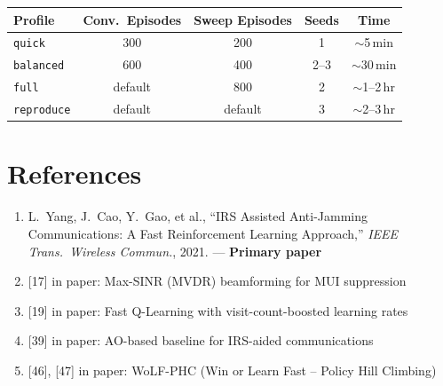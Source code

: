 \documentclass[11pt,a4paper]{article}
\begin{document}
\begin{table}[H]
\centering
\begin{tabular}{lcccc}
\toprule
\textbf{Profile} & \textbf{Conv.\ Episodes} & \textbf{Sweep Episodes} & \textbf{Seeds} & \textbf{Time} \\
\midrule
\texttt{quick} & 300 & 200 & 1 & $\sim$5\,min \\
\texttt{balanced} & 600 & 400 & 2--3 & $\sim$30\,min \\
\texttt{full} & default & 800 & 2 & $\sim$1--2\,hr \\
\texttt{reproduce} & default & default & 3 & $\sim$2--3\,hr \\
\bottomrule
\end{tabular}
\end{table}


\section{References}

\begin{enumerate}
    \item L.~Yang, J.~Cao, Y.~Gao, et al., ``IRS Assisted Anti-Jamming Communications: A Fast Reinforcement Learning Approach,'' \emph{IEEE Trans.\ Wireless Commun.}, 2021. --- \textbf{Primary paper}
    \item {[17] in paper}: Max-SINR (MVDR) beamforming for MUI suppression
    \item {[19] in paper}: Fast Q-Learning with visit-count-boosted learning rates
    \item {[39] in paper}: AO-based baseline for IRS-aided communications
    \item {[46], [47] in paper}: WoLF-PHC (Win or Learn Fast -- Policy Hill Climbing)
\end{enumerate}
\end{document}
